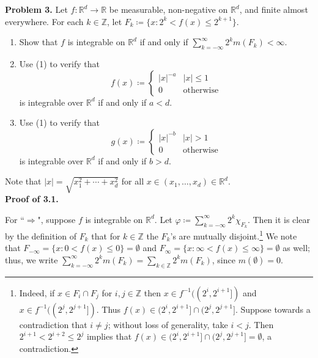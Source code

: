 \noindent \textbf{Problem 3.} Let \( f : \mathbb{R}^{d} \to \mathbb{R} \) be measurable, non-negative on \( \mathbb{R}^{d}  \), and finite almost everywhere. For each \( k \in \mathbb{Z}  \), let \( F_k \coloneqq \{ x : 2^{k} < f(x) \leq 2^{k+1}  \}  \).
\begin{enumerate}
	\item Show that \( f \) is integrable on \( \mathbb{R}^{d}  \) if and only if \( \sum_{k=-\infty}^{\infty} 2^{k} m(F_k) < \infty \).
	\item Use (1) to verify that \[f(x) \coloneqq \begin{cases}
		|x|^{-a}  & |x| \leq 1 \\
		0 & \mbox{otherwise}
	\end{cases}\] is integrable over \( \mathbb{R}^{d}  \) if and only if \( a < d \).
	\item Use (1) to verify that \[g(x) \coloneqq \begin{cases}
		|x|^{-b}  & |x| > 1 \\
		0 & \mbox{otherwise}
	\end{cases}\] is integrable over \( \mathbb{R}^{d}  \) if and only if \( b > d \).
	

	
	
\end{enumerate}
Note that \( |x| = \sqrt{x_1^{2} + \cdots + x_d^{2} }  \) for all \( x \in (x_1, \hdots ,x_d) \in \mathbb{R}^{d}  \). \\

\noindent \textbf{Proof of 3.1.}

\noindent For ``$\Rightarrow$", suppose \( f \) is integrable on \( \mathbb{R}^{d}  \). Let \( \varphi \coloneqq \sum_{k=-\infty}^{\infty}2^{k} \chi_{F_{k} }  \). Then it is clear by the definition of \( F_{k}  \) that for \( k \in \mathbb{Z}  \) the \( F_{k}  \)'s are mutually disjoint.\footnote{Indeed, if \( x \in F_{i} \cap F_{j}  \) for \( i,j \in \mathbb{Z}  \) then \( x \in f ^{-1} ((2^{i} , 2^{i+1} ])  \) and \( x \in f ^{-1} ((2^{j} , 2^{j+1} ])  \). Thus \( f(x) \in (2^{i} , 2^{i+1} ] \cap (2^{j}, 2^{j+1}]   \). Suppose towards a contradiction that \( i \neq j \); without loss of generality, take \( i < j \). Then \( 2^{i+1} < 2^{i+2} \leq 2^{j}   \) implies that \( f(x) \in (2^{i} , 2^{i+1}] \cap (2^{j} , 2^{j+1} ] = \emptyset   \), a contradiction.} We note that \( F_{-\infty} = \{ x : 0 < f(x) \leq 0 \} = \emptyset  \) and \( F_{\infty} = \{ x : \infty< f(x) \leq \infty \} = \emptyset  \) as well; thus, we write \( \sum_{k=-\infty}^{\infty}2^{k} m(F_{k} ) = \sum_{k \in \mathbb{Z} }^{}2^{k} m(F_{k} ) \), since \( m(\emptyset ) = 0 \).

